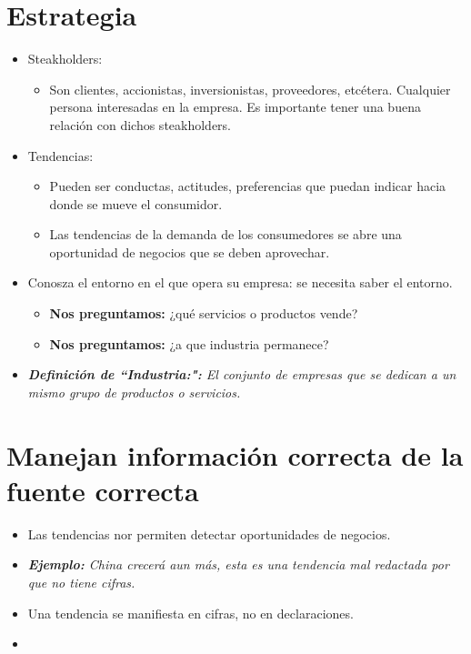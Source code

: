 \section{Estrategia}
\begin{itemize}
    \item Steakholders:
        \begin{itemize}
            \item Son clientes, accionistas, inversionistas, proveedores, etcétera. Cualquier persona interesadas en la empresa. Es importante tener una buena relación con dichos steakholders.
        \end{itemize}
    
    \item Tendencias: 
        \begin{itemize}
            \item Pueden ser conductas, actitudes, preferencias que puedan indicar hacia donde se mueve el consumidor.
            \item Las tendencias de la demanda de los consumedores se abre una oportunidad de negocios que se deben aprovechar.
        \end{itemize}
    
    \item Conosza el entorno en el que opera su empresa: se necesita saber el entorno.
        \begin{itemize}
            \item \textbf{Nos preguntamos:} ¿qué servicios o productos vende?
            \item \textbf{Nos preguntamos:} ¿a que industria permanece?
        \end{itemize}
        
    \item \emph{\textbf{Definición de ``Industria:":} El conjunto de empresas que se dedican a un mismo grupo de productos o servicios.}
\end{itemize}


\section{Manejan información correcta de la fuente correcta}
\begin{itemize}
    \item Las tendencias nor permiten detectar oportunidades de negocios.
    \item \emph{\textbf{Ejemplo: }China crecerá aun más, esta es una tendencia mal redactada por que no tiene cifras.}
    \item Una tendencia se manifiesta en cifras, no en declaraciones.
    \item 
\end{itemize}
